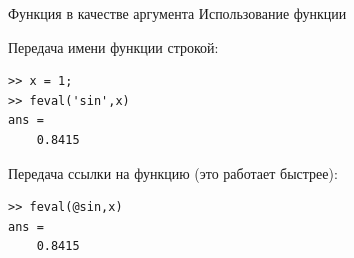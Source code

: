 \documentclass[11pt, compress]{beamer}
\begin{document}
\begin{frame}[fragile]{Функция в качестве аргумента}
Использование функции 

Передача имени функции строкой:
\begin{lstlisting}
>> x = 1;
>> feval('sin',x)
ans =
    0.8415
\end{lstlisting}

Передача ссылки на функцию (это работает быстрее):
\begin{lstlisting}
>> feval(@sin,x)
ans =
    0.8415
\end{lstlisting}
\end{frame}

%
%
%
%
%

 

\end{document}
